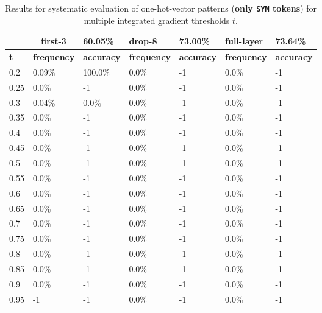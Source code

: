 
\begin{table}[t]
\centering
\begin{tabular}{lllllll}
\hline
\multicolumn{1}{c}{} & \multicolumn{1}{c}{first-3} & \multicolumn{1}{l|}{60.05\%} & drop-8 & \multicolumn{1}{l|}{73.00\%} & full-layer & 73.64\% \\ \hline
\multicolumn{1}{l|}{\textbf{t}} & \textbf{frequency} & \multicolumn{1}{l|}{\textbf{accuracy}} & \textbf{frequency} & \multicolumn{1}{l|}{\textbf{accuracy}} & \textbf{frequency} & \textbf{accuracy} \\ \hline	\multicolumn{1}{l|}{0.2}&  0.09\% & \multicolumn{1}{l|}{100.0\%}& 0.0\% & \multicolumn{1}{l|}{-1}& 0.0\% & -1\\ 
\multicolumn{1}{l|}{0.25}&  0.0\% & \multicolumn{1}{l|}{-1}& 0.0\% & \multicolumn{1}{l|}{-1}& 0.0\% & -1\\ 
\multicolumn{1}{l|}{0.3}&  0.04\% & \multicolumn{1}{l|}{0.0\%}& 0.0\% & \multicolumn{1}{l|}{-1}& 0.0\% & -1\\ 
\multicolumn{1}{l|}{0.35}&  0.0\% & \multicolumn{1}{l|}{-1}& 0.0\% & \multicolumn{1}{l|}{-1}& 0.0\% & -1\\ 
\multicolumn{1}{l|}{0.4}&  0.0\% & \multicolumn{1}{l|}{-1}& 0.0\% & \multicolumn{1}{l|}{-1}& 0.0\% & -1\\ 
\multicolumn{1}{l|}{0.45}&  0.0\% & \multicolumn{1}{l|}{-1}& 0.0\% & \multicolumn{1}{l|}{-1}& 0.0\% & -1\\ 
\multicolumn{1}{l|}{0.5}&  0.0\% & \multicolumn{1}{l|}{-1}& 0.0\% & \multicolumn{1}{l|}{-1}& 0.0\% & -1\\ 
\multicolumn{1}{l|}{0.55}&  0.0\% & \multicolumn{1}{l|}{-1}& 0.0\% & \multicolumn{1}{l|}{-1}& 0.0\% & -1\\ 
\multicolumn{1}{l|}{0.6}&  0.0\% & \multicolumn{1}{l|}{-1}& 0.0\% & \multicolumn{1}{l|}{-1}& 0.0\% & -1\\ 
\multicolumn{1}{l|}{0.65}&  0.0\% & \multicolumn{1}{l|}{-1}& 0.0\% & \multicolumn{1}{l|}{-1}& 0.0\% & -1\\ 
\multicolumn{1}{l|}{0.7}&  0.0\% & \multicolumn{1}{l|}{-1}& 0.0\% & \multicolumn{1}{l|}{-1}& 0.0\% & -1\\ 
\multicolumn{1}{l|}{0.75}&  0.0\% & \multicolumn{1}{l|}{-1}& 0.0\% & \multicolumn{1}{l|}{-1}& 0.0\% & -1\\ 
\multicolumn{1}{l|}{0.8}&  0.0\% & \multicolumn{1}{l|}{-1}& 0.0\% & \multicolumn{1}{l|}{-1}& 0.0\% & -1\\ 
\multicolumn{1}{l|}{0.85}&  0.0\% & \multicolumn{1}{l|}{-1}& 0.0\% & \multicolumn{1}{l|}{-1}& 0.0\% & -1\\ 
\multicolumn{1}{l|}{0.9}&  0.0\% & \multicolumn{1}{l|}{-1}& 0.0\% & \multicolumn{1}{l|}{-1}& 0.0\% & -1\\ 
\multicolumn{1}{l|}{0.95}&  -1 & \multicolumn{1}{l|}{-1}& 0.0\% & \multicolumn{1}{l|}{-1}& 0.0\% & -1\\ 


\hline
\end{tabular}
\caption[Model Evaluation for only \texttt{SYM} tokens]{Results for systematic evaluation of one-hot-vector patterns (\textbf{only \texttt{SYM} tokens}) for multiple integrated gradient thresholds $t$.}
\label{tab:evalResultsSYM}
\end{table}
	